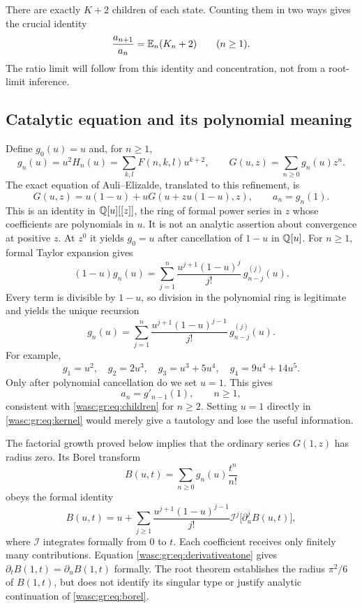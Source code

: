 \documentclass[11pt,a4paper]{article}
\theoremstyle{remark}\newtheorem{remark}[theorem]{Remark}
\numberwithin{equation}{section}
\begin{document}
There are exactly $K+2$ children of each state. Counting them in two ways gives the crucial identity
\begin{equation}\label{wasc:gr:eq:children}
\frac{a_{n+1}}{a_n}=\mathbb E_n(K_n+2)\qquad(n\ge1).
\end{equation}
The ratio limit will follow from this identity and concentration, not from a root-limit inference.

\subsection{Catalytic equation and its polynomial meaning}
Define $g_0(u)=u$ and, for $n\ge1$,
\[
g_n(u)=u^2H_n(u)=\sum_{k,l}F(n,k,l)u^{k+2},\qquad
G(u,z)=\sum_{n\ge0}g_n(u)z^n.
\]
The exact equation of Auli--Elizalde, translated to this refinement, is
\begin{equation}\label{wasc:gr:eq:kernel}
G(u,z)=u(1-u)+uG(u+zu(1-u),z),\qquad a_n=g_n(1).
\end{equation}
This is an identity in $\mathbb Q[u][[z]]$, the ring of formal power series in $z$ whose coefficients are polynomials in $u$. It is not an analytic assertion about convergence at positive $z$. At $z^0$ it yields $g_0=u$ after cancellation of $1-u$ in $\mathbb Q[u]$. For $n\ge1$, formal Taylor expansion gives
\[
(1-u)g_n(u)=\sum_{j=1}^{n}
\frac{u^{j+1}(1-u)^j}{j!}\,g_{n-j}^{(j)}(u).
\]
Every term is divisible by $1-u$, so division in the polynomial ring is legitimate and yields the unique recursion
\begin{equation}\label{wasc:gr:eq:derivative}
g_n(u)=\sum_{j=1}^{n}
\frac{u^{j+1}(1-u)^{j-1}}{j!}\,g_{n-j}^{(j)}(u).
\end{equation}
For example,
\[
g_1=u^2,\quad g_2=2u^3,\quad g_3=u^3+5u^4,
\quad g_4=9u^4+14u^5.
\]
Only after polynomial cancellation do we set $u=1$. This gives
\begin{equation}\label{wasc:gr:eq:derivativeatone}
a_n=g'_{n-1}(1),\qquad n\ge1,
\end{equation}
consistent with \eqref{wasc:gr:eq:children} for $n\ge2$. Setting $u=1$ directly in \eqref{wasc:gr:eq:kernel} would merely give a tautology and lose the useful information.

The factorial growth proved below implies that the ordinary series $G(1,z)$ has radius zero. Its Borel transform
\[
B(u,t)=\sum_{n\ge0}g_n(u)\frac{t^n}{n!}
\]
obeys the formal identity
\begin{equation}\label{wasc:gr:eq:borel}
B(u,t)=u+\sum_{j\ge1}\frac{u^{j+1}(1-u)^{j-1}}{j!}
\mathcal I^j\bigl[\partial_u^jB(u,t)\bigr],
\end{equation}
where $\mathcal I$ integrates formally from $0$ to $t$. Each coefficient receives only finitely many contributions. Equation \eqref{wasc:gr:eq:derivativeatone} gives $\partial_tB(1,t)=\partial_uB(1,t)$ formally. The root theorem establishes the radius $\pi^2/6$ of $B(1,t)$, but does not identify its singular type or justify analytic continuation of \eqref{wasc:gr:eq:borel}.
\end{document}
